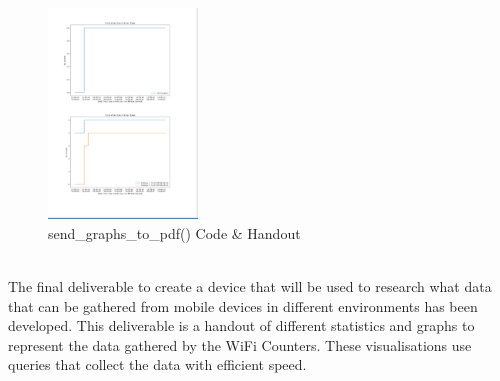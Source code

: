 \documentclass{report}
\begin{document}
\begin{figure}[h!]
     \includegraphics[width=150]{handout2.PNG}
    \caption{send\_graphs\_to\_pdf() Code & Handout}
    \label{fig:sendPdfPlusHandout}
\end{figure} \\ 
The final deliverable to create a device that will be used to research what data that can be gathered from mobile devices in different environments has been developed. This deliverable is a handout of different statistics and graphs to represent the data gathered by the WiFi Counters. These visualisations use queries that collect the data with efficient speed.
\clearpage
 
\end{document}

